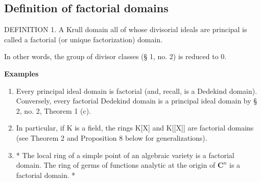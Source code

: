 \subsection{Definition of factorial domains}

DEFINITION 1. A Krull domain all of whose divisorial ideals are principal is called a factorial (or unique factorization) domain.

In other words, the group of divisor classes (§ 1, no. 2) is reduced to 0.

\textbf{Examples}\par

\begin{enumerate}
\def\labelenumi{(\arabic{enumi})}
\item
  Every principal ideal domain is factorial (and, recall, is a Dedekind domain). Conversely, every factorial Dedekind domain is a principal ideal domain by § 2, no. 2, Theorem 1 (c).
\item
  In particular, if K is a field, the rings K{[}X{]} and K{[}{[}X{]}{]} are factorial domains (see Theorem 2 and Proposition 8 below for generalizations).
\item
  * The local ring of a simple point of an algebraic variety is a factorial domain. The ring of germs of functions analytic at the origin of \(\mathbf{C}^n\) is a factorial domain. *
\end{enumerate}


